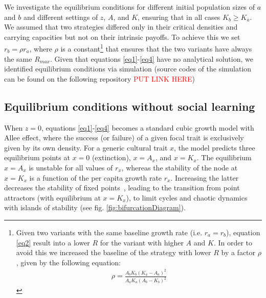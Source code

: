 \documentclass[review,authoryear]{elsarticle}
\begin{document}
We investigate the equilibrium conditions for different initial population sizes of $a$ and $b$ and different settings of $z$, $A$, and $K$, ensuring that in all cases $K_b \geq K_a$. We assumed that two strategies differed only in their critical densities and carrying capacities but not on their intrinsic payoffs. To achieve this we set $r_b=\rho r_a$, where $\rho$ is a constant\footnote{Given two variants with the same baseline growth rate (i.e. $r_a=r_b$), equation \eqref{eq2} result into a lower $R$ for the variant with higher $A$ and $K$. In order to avoid this we increased the baseline of the strategy with lower $R$ by a factor $\rho$, given by the following equation:
\begin{align*}
\rho=\frac{A_bK_b(K_a-A_a)^2}{A_aK_a(A_b-K_b)^2}
\end{align*}
  } 
that ensures that the two variants have always the same $R_{max}$. Given that equations \ref{eq1}-\ref{eq4} have no analytical solution, we identified equilibrium conditions via simulation (source codes of the simulation can be found on the following repository \textcolor{red}{PUT LINK HERE})

\subsection{Equilibrium conditions without social learning}

When $z=0$, equations \ref{eq1}-\ref{eq4} becomes a standard cubic growth model with Allee effect, where the success (or failure) of a given focal trait is exclusively given by its own density. For a generic cultural trait $x$, the model predicts three equilibrium points at $x=0$ (extinction), $x=A_x$, and $x=K_x$. The equilibrium $x=A_x$ is unstable for all values of $r_x$, whereas the stability of the node at $x=K_x$ is a function of the per capita growth rate $r_x$. Increasing the latter decreases the stability of fixed points~\citep{scheuring_1999}, leading to the transition from point attractors (with equilibrium at $x=K_x$), to limit cycles and chaotic dynamics with islands of stability (see fig. \ref{fig:bifurcationDiagram}). 
\end{document}
